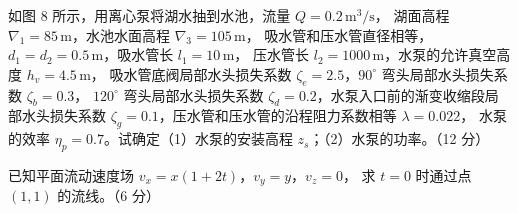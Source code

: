 \begin{ti}
  \item 如图 8 所示，用离心泵将湖水抽到水池，流量 $Q=0.2\,\mathrm{m^3/s}$，
  湖面高程 $\nabla_1=85\,\mathrm{m}$，水池水面高程 $\nabla_3=105\,\mathrm{m}$，
  吸水管和压水管直径相等，$d_1=d_2=0.5\,\mathrm{m}$，吸水管长 $l_1=10\,\mathrm{m}$，
  压水管长 $l_2=1000\,\mathrm{m}$，水泵的允许真空高度 $h_v=4.5\,\mathrm{m}$，
  吸水管底阀局部水头损失系数 $\zeta_e=2.5$，$90^\circ$ 弯头局部水头损失系数 $\zeta_b=0.3$，
  $120^\circ$ 弯头局部水头损失系数 $\zeta_d=0.2$，水泵入口前的渐变收缩段局部水头损失系数
  $\zeta_g=0.1$，压水管和压水管的沿程阻力系数相等 $\lambda=0.022$，
  水泵的效率 $\eta_p=0.7$。试确定（1）水泵的安装高程 $z_s$；（2）水泵的功率。（12 分）
  \hfill{}

  \item 已知平面流动速度场 $v_x=x(1+2t)$，$v_y=y$，$v_z=0$，
  求 $t=0$ 时通过点 $(1,1)$ 的流线。（6 分）\hfill{}
\end{ti}


